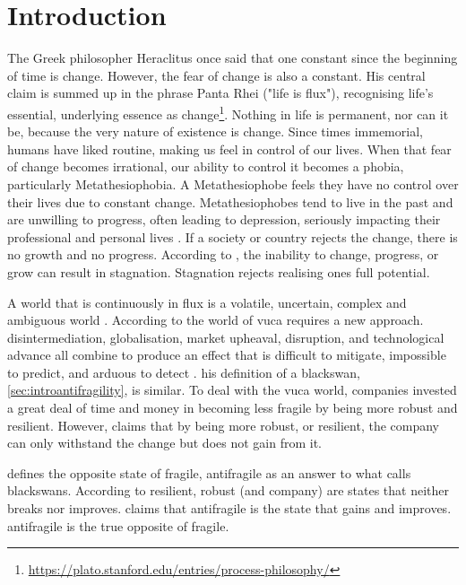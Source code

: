 \chapter{Introduction}
\label{ch:introduction}
\setcounter{footnote}{0}
The Greek philosopher Heraclitus once said that one constant since the beginning of time is change. However, the fear of change is also a constant.  His central claim is summed up in the phrase Panta Rhei ("life is flux"), recognising life's essential, underlying essence as change\footnote{\url{https://plato.stanford.edu/entries/process-philosophy/}}. Nothing in life is permanent, nor can it be, because the very nature of existence is change. Since times \gls{immemorial}, humans have liked routine, making us feel in control of our lives. When that fear of change becomes irrational, our ability to control it becomes a phobia, particularly Metathesiophobia. A Metathesiophobe feels they have no control over their lives due to constant change. Metathesiophobes tend to live in the past and are unwilling to progress, often leading to depression, seriously impacting their professional and personal lives \parencite{PsychTimes}. If a society or country rejects the change, there is no growth and no progress. According to \textcite{Mark2010}, the inability to change, progress, or grow can result in stagnation. Stagnation rejects realising ones full potential.

A world that is continuously in flux is a volatile, uncertain, complex and ambiguous world \parencites{Bennett2014}{Sinha2020}. According to \textcite{Bennett2014} the world of \acrfull{vuca} requires a new approach. \Gls{disintermediation}, globalisation, market upheaval, disruption, and technological advance all combine to produce an effect that is difficult to mitigate,  impossible to predict, and \gls{arduous} to detect \parencite[p.~885]{OReilly2019}. \textcite{Taleb2008} his definition of a \gls{blackswan}, \cref{sec:introantifragility}, is similar. To deal with the \acrshort{vuca} world, companies invested a great deal of time and money in becoming less \gls{fragile} by being more \gls{robust} and \gls{resilient}. However, \textcite{Taleb2012} claims that by being more \gls{robust}, or \gls{resilient}, the company can only withstand the change but does not gain from it.

\textcite{Taleb2012} defines the opposite state of \gls{fragile}, \gls{antifragile} as an answer to what \textcite{Taleb2008} calls \glspl{blackswan}. According to \textcite{Taleb2012} \gls{resilient}, \gls{robust} (and company) are states that neither breaks nor improves. \textcite{Taleb2012} claims that \gls{antifragile} is the state that gains and improves. \Gls{antifragile} is the true opposite of \gls{fragile}.

